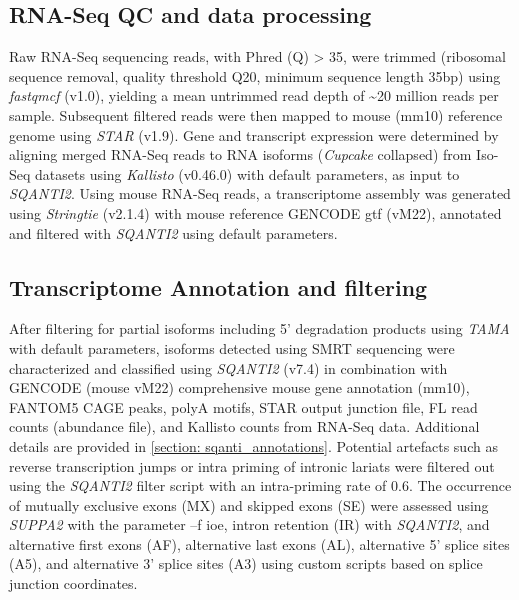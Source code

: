 \subsection{RNA-Seq QC and data processing}
Raw RNA-Seq sequencing reads, with Phred (Q) > 35, were trimmed (ribosomal sequence removal, quality threshold Q20, minimum sequence length 35bp) using \textit{fastqmcf} (v1.0), yielding a mean untrimmed read depth of \textasciitilde20 million reads per sample. Subsequent filtered reads were then mapped to mouse (mm10) reference genome using \textit{STAR}\cite{Dobin2013} (v1.9). Gene and transcript expression were determined by aligning merged RNA-Seq reads to RNA isoforms (\textit{Cupcake} collapsed) from Iso-Seq datasets using \textit{Kallisto}\cite{Bray2016} (v0.46.0) with default parameters, as input to \textit{SQANTI2}. Using mouse RNA-Seq reads, a transcriptome assembly was generated using \textit{Stringtie}\cite{Pertea2015} (v2.1.4) with mouse reference GENCODE gtf (vM22), annotated and filtered with \textit{SQANTI2} using default parameters. 

\subsection{Transcriptome Annotation and filtering}
\label{ch4: transcriptome_annotation}
After filtering for partial isoforms including 5’ degradation products using \textit{TAMA} with default parameters, isoforms detected using SMRT sequencing were characterized and classified using \textit{SQANTI2} (v7.4) in combination with GENCODE (mouse vM22) comprehensive mouse gene annotation (mm10), FANTOM5 CAGE peaks, polyA motifs, STAR output junction file, FL read counts (abundance file), and Kallisto counts from RNA-Seq data. Additional details are provided in \cref{section: sqanti_annotations}. Potential artefacts such as reverse transcription jumps or intra priming of intronic lariats were filtered out using the \textit{SQANTI2} filter script with an intra-priming rate of 0.6. The occurrence of mutually exclusive exons (MX) and skipped exons (SE) were assessed using \textit{SUPPA2}\cite{Trincado2018} with the parameter –f ioe, intron retention (IR) with \textit{SQANTI2}, and alternative first exons (AF), alternative last exons (AL), alternative 5’ splice sites (A5), and alternative 3’ splice sites (A3) using custom scripts based on splice junction coordinates. 

